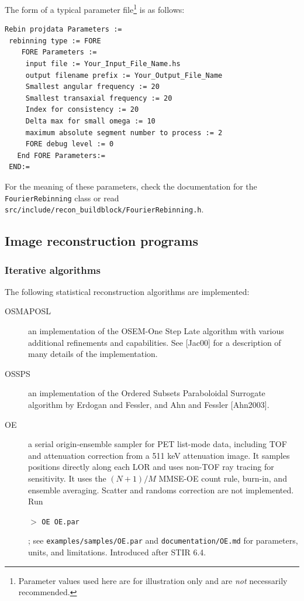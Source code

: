 \documentclass{article}
\newcommand{\cmdline}[1]{\par \noindent $>$ \texttt{#1}\par}
\begin{document}
The form of a typical parameter file\footnote{Parameter values used here are for
illustration only and are \textit{not} necessarily recommended.} is as follows:

{\small 
\begin{verbatim}
Rebin projdata Parameters :=
 rebinning type := FORE
    FORE Parameters :=
     input file := Your_Input_File_Name.hs
     output filename prefix := Your_Output_File_Name
     Smallest angular frequency := 20
     Smallest transaxial frequency := 20
     Index for consistency := 20
     Delta max for small omega := 10
     maximum absolute segment number to process := 2
     FORE debug level := 0
   End FORE Parameters:=
 END:=
\end{verbatim}
}
For the meaning of these parameters, check the documentation for the
\texttt{FourierRebinning} class or read
\texttt{src/include/recon\_buildblock/FourierRebinning.h}.

\subsection{
Image reconstruction programs}
\label{sec:imagereconstructionprograms}



\subsubsection{
Iterative algorithms}

The following statistical reconstruction algorithms are implemented:
\begin{description}
\item[OSMAPOSL] an implementation 
of the OSEM-One Step Late algorithm with various additional refinements 
and capabilities. See [Jac00] for a description of many details of the
implementation.
\item[OSSPS] an implementation of the Ordered Subsets Paraboloidal
Surrogate algorithm by Erdogan and Fessler, and Ahn and Fessler [Ahn2003]. 
\item[OE] a serial origin-ensemble sampler for PET list-mode data, including TOF
and attenuation correction from a 511 keV attenuation image. It samples positions
directly along each LOR and uses non-TOF ray tracing for sensitivity. It uses the
$(N+1)/M$ MMSE-OE count rule, burn-in, and ensemble averaging. Scatter and randoms
correction are not implemented. Run \cmdline{OE OE.par}; see
\texttt{examples/samples/OE.par} and \texttt{documentation/OE.md} for parameters,
units, and limitations. Introduced after STIR 6.4.
\end{description}
\end{document}
